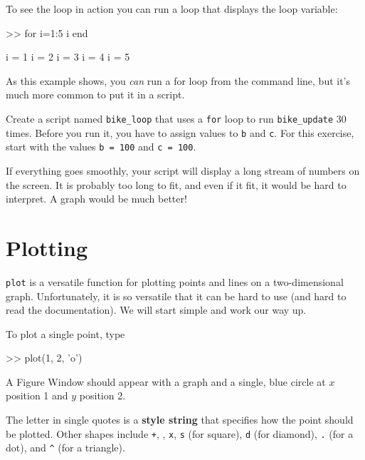\documentclass[main.tex]{subfiles}
\begin{document}

To see the loop in action you can run a loop that displays the
loop variable:

\begin{code}
>> for i=1:5
    i
end

i = 1
i = 2
i = 3
i = 4
i = 5
\end{code}

As this example shows, you {\em can} run a for loop from the
command line, but it's much more common to put it in a script.

\begin{ex}
Create a script named \verb"bike_loop" that uses a {\tt for} loop to run \verb"bike_update" 30 times.  Before you run it, you have to assign values to {\tt b} and {\tt c}.
For this exercise, start with the values {\tt b = 100} and {\tt c = 100}.

If everything goes smoothly, your script will display a long stream
of numbers on the screen.  It is probably too long
to fit, and even if it fit, it would be hard to interpret.
A graph would be much better!
\end{ex}


\section{Plotting}
\label{sect:plotting}


{\tt plot} is a versatile function for plotting points and lines
on a two-dimensional graph.  Unfortunately, it is so versatile
that it can be hard to use (and hard to read the documentation).
We will start simple and work our way up.

To plot a single point, type

\begin{code}
>> plot(1, 2, 'o')
\end{code}

A {\sf Figure Window} should appear with a graph and a single, blue circle
at $x$ position 1 and $y$ position 2.  


The letter in single quotes is a {\bf style string} that specifies how the
point should be plotted.
Other shapes include {\tt +},
{\tt *},
{\tt x},
{\tt s} (for square),
{\tt d} (for diamond), 
{\tt .} (for a dot), and
\verb+^+ (for a triangle).
\end{document}
